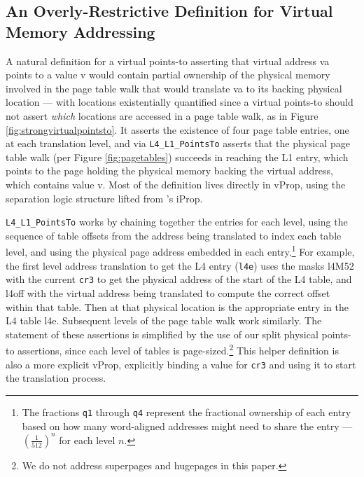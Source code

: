 \subsection{An Overly-Restrictive Definition for Virtual Memory Addressing}
\label{sec:overly-restrictive}
A natural definition for a virtual points-to
asserting that virtual address \textsf{va} points to a value \textsf{v}
would 
contain
partial ownership of the physical memory involved in the page table walk that would translate \textsf{va} to
its backing physical location --- with locations existentially quantified since a virtual points-to should not assert
\emph{which} locations are accessed in a page table walk, as in Figure \ref{fig:strongvirtualpointsto}.
It asserts the existence of four page table entries, one at each translation level, and via \lstinline|L4_L1_PointsTo|
asserts that the physical page table walk (per Figure \ref{fig:pagetables}) succeeds in reaching the L1 entry,
which points to the page holding the physical memory backing the virtual address, which contains value \textsf{v}.
Most of the definition lives directly in \textsf{vProp}, using the separation logic structure lifted from \iris's \textsf{iProp}.

\lstinline|L4_L1_PointsTo| works by
chaining together the entries for each level, using the sequence of table offsets from the address being translated to index
each table level, and using the physical page address embedded in each entry.\footnote{
  The fractions \lstinline|q1| through \lstinline|q4| represent the fractional ownership of each entry based on how many
  word-aligned addresses might need to share the entry ---  $(\frac{1}{512})^n$ for each level $n$.
}
For example, 
  the first level address translation to get the L4 entry (\lstinline|l4e|) 
  uses the masks \textsf{l4M52} with the current \lstinline|cr3| to get the 
  physical address of the start of the L4 table,
  and \textsf{l4off} with the virtual address being translated to compute the correct offset within that table.
  Then at that physical location is the appropriate entry in the L4 table \textsf{l4e}.
  Subsequent levels of the page table walk work similarly.
The statement of these assertions is simplified by the use of our split physical points-to assertions, since
each level of tables is page-sized.\footnote{We do not address superpages and hugepages in this paper.}
This helper definition is also a more explicit \textsf{vProp}, explicitly binding a value for \lstinline|cr3| and using it
to start the translation process.


